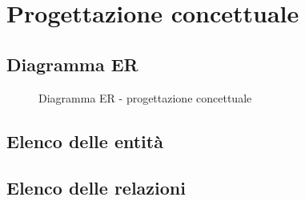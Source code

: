 \section{Progettazione concettuale}
\subsection{Diagramma ER}
\begin{figure}
    \centering
    \caption{Diagramma ER - progettazione concettuale}
    
    \label{fig:er_conp}
\end{figure}
\subsection{Elenco delle entità}
\subsection{Elenco delle relazioni}